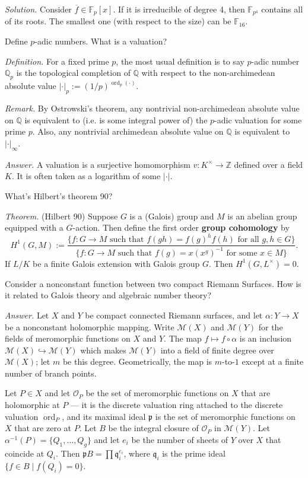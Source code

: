 \documentclass{mathproblems}
\newcommand\Q{\mathbb{Q}}
\newcommand\Z{\mathbb{Z}}
\newcommand\F{\mathbb{F}}
\begin{document}
\begin{questions}
\textit{Solution.} Consider $\overline{f}\in \F_p[x]$. If it is irreducible of degree 4, then $\F_{p^4}$ contains all of its roots. The smallest one (with respect to the size) can be $\F_{16}$.

\miquestion
{\color{blue} Define $p$-adic numbers. What is a valuation?}

\textit{Definition.} For a fixed prime $p$, the most usual definition is to say $p$-adic number $\Q_p$ is the topological completion of $\Q$ with respect to the non-archimedean absolute value $|\cdot|_p:=(1/p)^{\operatorname{ord}_p(\cdot)}$.

\textit{Remark.} By Ostrowski's theorem, any nontrivial non-archimedean absolute value on $\Q$ is equivalent to (i.e. is some integral power of) the $p$-adic valuation for some prime $p$. Also, any nontrivial archimedean absolute value on $\Q$ is equivalent to $|\cdot|_\infty$.

\textit{Answer.} A valuation is a surjective homomorphism $v:K^\times\to \Z$ defined over a field $K$. It is often taken as a logarithm of some $|\cdot|$.



\miquestion
{\color{blue} What's Hilbert's theorem 90?}

{\color{violet}
\textit{Theorem.} (Hilbert 90) Suppose $G$ is a (Galois) group and $M$ is an abelian group equipped with a $G$-action. Then define the first order \textbf{group cohomology} by
$$
H^1(G,M):=\frac{\{f:G\to M \text{ such that } f(gh)=f(g)^hf(h)\text{ for all }g,h\in G\}}{\{f:G\to M \text{ such that } f(g)=x(x^g)^{-1}\text{ for some } x\in M\}}.
$$
If $L/K$ be a finite Galois extension with Galois group $G$. Then $H^1(G,L^\times)=0$.
}

\miquestion
{\color{blue} Consider a nonconstant function between two compact Riemann Surfaces. How is it related to Galois theory and algebraic number theory?}

\textit{Answer.} Let $X$ and $Y$ be compact connected Riemann surfaces, and let $\alpha: Y \rightarrow X$ be a nonconstant holomorphic mapping. Write $\mathcal{M}(X)$ and $\mathcal{M}(Y)$ for the fields of meromorphic functions on $X$ and $Y$. The map $f \mapsto f \circ \alpha$ is an inclusion $\mathcal{M}(X) \hookrightarrow \mathcal{M}(Y)$ which makes $\mathcal{M}(Y)$ into a field of finite degree over $\mathcal{M}(X)$; let $m$ be this degree. Geometrically, the map is $m$-to-$1$ except at a finite number of branch points.

Let $P \in X$ and let $\mathcal{O}_P$ be the set of meromorphic functions on $X$ that are holomorphic at $P$ --- it is the discrete valuation ring attached to the discrete valuation $\operatorname{ord}_P$, and its maximal ideal $\mathfrak{p}$ is the set of meromorphic functions on $X$ that are zero at $P$. Let $B$ be the integral closure of $\mathcal{O}_P$ in $\mathcal{M}(Y)$. Let $\alpha^{-1}(P)=\{Q_1, \ldots, Q_g\}$ and let $e_i$ be the number of sheets of $Y$ over $X$ that coincide at $Q_i$. Then $\mathfrak{p} B=\prod \mathfrak{q}_i^{e_i}$, where $\mathfrak{q}_i$ is the prime ideal $\{f \in B \mid f(Q_i)=0\}$.
\end{questions}
\end{document}
